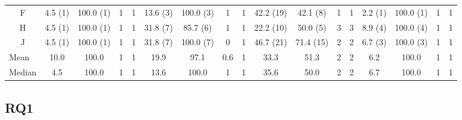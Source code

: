 \begin{landscape}
\begin{table}
\begin{tabular}{@{}ccccccccccccccccc@{}}
      \multicolumn{1}{c|}{F}              & 4.5 (1)  & 100.0 (1) & 1    & \multicolumn{1}{c|}{1}    & 13.6 (3)                 & 100.0 (3)                & 1                        & \multicolumn{1}{c|}{1}    & 42.2 (19) & 42.1 (8)                 & 1                        & \multicolumn{1}{c|}{1}    & 2.2 (1)                  & 100.0 (1)                & 1                        & 1                        \\
      \multicolumn{1}{c|}{H}              & 4.5 (1)  & 100.0 (1) & 1    & \multicolumn{1}{c|}{1}    & 31.8 (7)                 & 85.7 (6)                 & 1                        & \multicolumn{1}{c|}{1}    & 22.2 (10) & 50.0 (5)                 & 3                        & \multicolumn{1}{c|}{3}    & 8.9 (4)                  & 100.0 (4)                & 1                        & 1                        \\
      \multicolumn{1}{c|}{J}              & 4.5 (1)  & 100.0 (1) & 1    & \multicolumn{1}{c|}{1}    & 31.8 (7)                 & 100.0 (7)                & 0                        & \multicolumn{1}{c|}{1}    & 46.7 (21) & 71.4 (15)                & 2                        & \multicolumn{1}{c|}{2}    & 6.7 (3)                  & 100.0 (3)                & 1                        & 1                        \\ \midrule
      \multicolumn{1}{l|}{Mean}           & 10.0     & 100.0     & 1    & \multicolumn{1}{c|}{1}    & 19.9                     & 97.1                     & 0.6                      & \multicolumn{1}{c|}{1}    & 33.3      & 51.3                     & 2                        & \multicolumn{1}{c|}{2}    & 6.2                      & 100.0                    & 1                        & 1                        \\
      \multicolumn{1}{l|}{Median}         & 4.5      & 100.0     & 1    & \multicolumn{1}{c|}{1}    & 13.6                     & 100.0                    & 1                        & \multicolumn{1}{c|}{1}    & 35.6      & 50.0                     & 2                        & \multicolumn{1}{c|}{2}    & 6.7                      & 100.0                    & 1                        & 1                        \\ \bottomrule
    \end{tabular}
    \label{tab:Results-Quantitative-BA}
  \end{table}
\end{landscape}

\subsection{RQ1}

